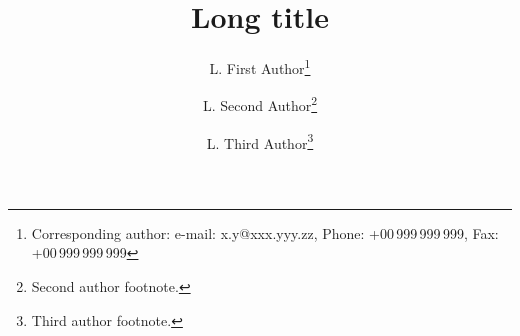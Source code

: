 \documentclass[mlq,fleqn]{w-art}
\begin{document}



\title[Short Title]{Long title}


\author[Sh. First Author]{L. First Author\footnote{Corresponding
     author: e-mail: {\sf x.y@xxx.yyy.zz}, Phone: +00\,999\,999\,999,
     Fax: +00\,999\,999\,999}} \address[\inst{1}]{First address}
\author[Sh. Second Author]{L. Second Author\footnote{Second author footnote.}}
\address[\inst{2}]{Second address}
\author[Sh. Third Author]{L. Third Author\footnote{Third author footnote.}}
\begin{abstract}
\end{abstract}
\maketitle                   %
\end{document}

